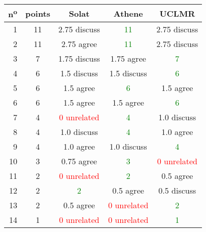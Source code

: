 \begin{center}
 \begin{tabular}{ r | c || c c c }
  n\textsuperscript{o} & points & Solat                        & Athene                       & UCLMR                        \\ \hline
  1                    & 11     & 2.75 discuss                 & \textcolor{green}{11}        & 2.75 discuss                 \\
  2                    & 11     & 2.75 agree                   & \textcolor{green}{11}        & 2.75 discuss                 \\
  3                    & 7      & 1.75 discuss                 & 1.75 agree                   & \textcolor{green}{7}         \\
  4                    & 6      & 1.5 discuss                  & 1.5 discuss                  & \textcolor{green}{6}         \\
  5                    & 6      & 1.5 agree                    & \textcolor{green}{6}         & 1.5 agree                    \\
  6                    & 6      & 1.5 agree                    & 1.5 agree                    & \textcolor{green}{6}         \\
  7                    & 4      & \textcolor{red}{0 unrelated} & \textcolor{green}{4}         & 1.0 discuss                  \\
  8                    & 4      & 1.0 discuss                  & \textcolor{green}{4}         & 1.0 agree                    \\
  9                    & 4      & 1.0 agree                    & 1.0 discuss                  & \textcolor{green}{4}         \\
  10                   & 3      & 0.75 agree                   & \textcolor{green}{3}         & \textcolor{red}{0 unrelated} \\
  11                   & 2      & \textcolor{red}{0 unrelated} & \textcolor{green}{2}         & 0.5 agree                    \\
  12                   & 2      & \textcolor{green}{2}         & 0.5 agree                    & 0.5 discuss                  \\
  13                   & 2      & 0.5 agree                    & \textcolor{red}{0 unrelated} & \textcolor{green}{2}         \\
  14                   & 1      & \textcolor{red}{0 unrelated} & \textcolor{red}{0 unrelated} & \textcolor{green}{1}         \\

\end{tabular}
\end{center}
